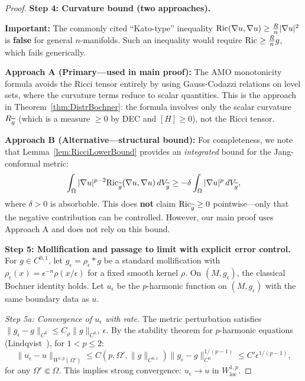 \begin{proof}
\textbf{Step 4: Curvature bound (two approaches).}

\textbf{Important:} The commonly cited ``Kato-type'' inequality $\mathrm{Ric}(\nabla u, \nabla u) \ge \frac{R}{n}|\nabla u|^2$ is \textbf{false} for general $n$-manifolds. Such an inequality would require $\mathrm{Ric} \ge \frac{R}{n}g$, which fails generically.

\textbf{Approach A (Primary---used in main proof):} The AMO monotonicity formula avoids the Ricci tensor entirely by using Gauss-Codazzi relations on level sets, where the curvature terms reduce to scalar quantities. This is the approach in Theorem~\ref{thm:DistrBochner}: the formula involves only the scalar curvature $R_{\widetilde{g}}$ (which is a measure $\ge 0$ by DEC and $[H]\ge 0$), not the Ricci tensor.

\textbf{Approach B (Alternative---structural bound):} For completeness, we note that Lemma~\ref{lem:RicciLowerBound} provides an \emph{integrated} bound for the Jang-conformal metric:
\begin{equation}\label{eq:RicciBound}
    \int_\Omega |\nabla u|^{p-2} \mathrm{Ric}_{\widetilde{g}}(\nabla u, \nabla u) \, dV_{\widetilde{g}} \ge -\delta \int_\Omega |\nabla u|^p \, dV_{\widetilde{g}},
\end{equation}
where $\delta > 0$ is absorbable. This does \textbf{not} claim $\mathrm{Ric}_{\widetilde{g}} \ge 0$ pointwise---only that the negative contribution can be controlled. However, our main proof uses Approach A and does not rely on this bound.

\textbf{Step 5: Mollification and passage to limit with explicit error control.}
For $g \in C^{0,1}$, let $g_\epsilon = \rho_\epsilon * g$ be a standard mollification with $\rho_\epsilon(x) = \epsilon^{-n}\rho(x/\epsilon)$ for a fixed smooth kernel $\rho$. On $(M, g_\epsilon)$, the classical Bochner identity holds. Let $u_\epsilon$ be the $p$-harmonic function on $(M, g_\epsilon)$ with the same boundary data as $u$.

\textit{Step 5a: Convergence of $u_\epsilon$ with rate.} 
The metric perturbation satisfies $\|g_\epsilon - g\|_{C^0} \le C_\rho \|g\|_{C^{0,1}} \epsilon$. By the stability theorem for $p$-harmonic equations (Lindqvist~\cite{lindqvist2017}), for $1 < p \le 2$:
\begin{equation}\label{eq:pHarmonicStabilityExplicit}
    \|u_\epsilon - u\|_{W^{1,p}(\Omega')} \le C(p, \Omega', \|g\|_{C^{0,1}}) \|g_\epsilon - g\|_{C^0}^{1/(p-1)} \le C' \epsilon^{1/(p-1)},
\end{equation}
for any $\Omega' \Subset \Omega$. This implies strong convergence: $u_\epsilon \to u$ in $W^{1,p}_{\mathrm{loc}}$.


\end{proof}
